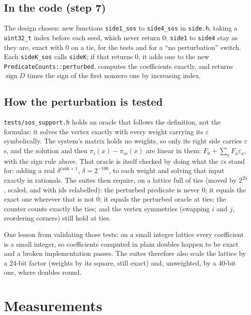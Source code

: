 \documentclass[11pt,a4paper]{article}
\newcommand{\code}[1]{\texttt{#1}}
\newcommand{\sgn}{\operatorname{sign}}
\theoremstyle{definition}
\theoremstyle{remark}
\begin{document}
\subsection{In the code (step 7)}

The design chosen: new functions \code{side1\_sos} to \code{side4\_sos} in \code{side.h}, taking a
\code{uint32\_t} index before each seed, which never return 0; \code{side1} to \code{side4} stay as
they are, exact with 0 on a tie, for the tests and for a ``no perturbation'' switch. Each
\code{sideK\_sos} calls \code{sideK}; if that returns 0, it adds one to the new
\code{PredicateCounts::perturbed}, computes the coefficients exactly, and returns
$\sgn D$ times the sign of the first nonzero one by increasing index.

\subsection{How the perturbation is tested}

\code{tests/sos\_support.h} holds an oracle that follows the definition, not the formulas: it
solves the vertex exactly with every weight carrying its $\varepsilon$ symbolically. The system's
matrix holds no weights, so only its right side carries $\varepsilon$s, and the solution and then
$\pi_i(x) - \pi_m(x)$ are linear in them: $F_0 + \sum_a F_a\varepsilon_a$, with the sign rule
above. That oracle is itself checked by doing what the $\varepsilon$s stand for: adding a real
$\delta^{\text{rank}+1}$, $\delta = 2^{-100}$, to each weight and solving that input exactly in
rationals. The suites then require, on a lattice full of ties (moved by $2^{20}$, scaled, and with
ids relabelled):
the perturbed predicate is never 0; it equals the exact one wherever that is not 0; it equals the
perturbed oracle at ties; the counter counts exactly the ties; and the vertex symmetries (swapping
$i$ and $j$, reordering corners) still hold at ties.

One lesson from validating those tests: on a small integer lattice every coefficient is a small
integer, so coefficients computed in plain doubles happen to be exact and a broken implementation
passes. The suites therefore also scale the lattice by a 24-bit factor (weights by its square,
still exact) and, unweighted, by a 40-bit one, where doubles round.

\section{Measurements}\label{sec:measured}
\end{document}
